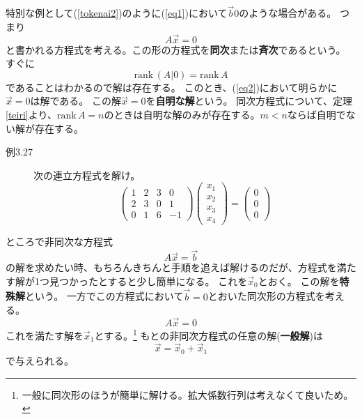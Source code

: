 \documentclass[10pt]{jsreport}
\theoremstyle{definition}%
\newcommand{\vc}[1]{\overrightarrow{#1}}%
\newcommand{\rank}{\mathrm{rank\,}}
\numberwithin{equation}{section}%
\begin{document}
特別な例として(\ref{tokenai2})のように(\ref{eq1})において$\vc{b}0$のような場合がある。
つまり
\begin{equation}
\label{eq2}  A\vc{x}=0
\end{equation}
と書かれる方程式を考える。この形の方程式を{\bf 同次}または{\bf 斉次}であるという。
すぐに
\begin{equation}
  \rank (A|0)=\rank A
\end{equation}
であることはわかるので解は存在する。
このとき、(\ref{eq2})において明らかに$\vc{x}=0$は解である。
この解$\vc{x}=0$を{\bf 自明な解}という。
同次方程式について、定理\ref{teiri}より、$\rank A= n $のときは自明な解のみが存在する。$m<n$ならば自明でない解が存在する。
\begin{description}
  \item[例3.27] 次の連立方程式を解け。
  \begin{equation}
    \begin{pmatrix}
      1 & 2 & 3 & 0\\
      2 & 3 & 0 & 1\\
      0 & 1 & 6 & -1
    \end{pmatrix}
    \begin{pmatrix}
    x_{1}\\
    x_{2}\\
    x_{3}\\
    x_{4}
    \end{pmatrix}=\begin{pmatrix}
      0\\
      0\\
      0
    \end{pmatrix}
  \end{equation} 
\end{description}

ところで非同次な方程式
\begin{equation}
  A\vc{x}=\vc{b}
\end{equation}
の解を求めたい時、もちろんきちんと手順を追えば解けるのだが、方程式を満たす解が1つ見つかったとすると少し簡単になる。
これを$\vc{x}_{0}$とおく。
この解を{\bf 特殊解}という。
一方でこの方程式において$\vc{b}=0$とおいた同次形の方程式を考える。
\begin{equation}
  A\vc{x}=0
\end{equation}
これを満たす解を$\vc{x}_{1}$とする。\footnote{一般に同次形のほうが簡単に解ける。拡大係数行列は考えなくて良いため。}
もとの非同次方程式の任意の解({\bf 一般解})は
\begin{equation}
  \vc{x}=\vc{x}_{0}+\vc{x}_{1}
\end{equation}
で与えられる。
\end{document}
